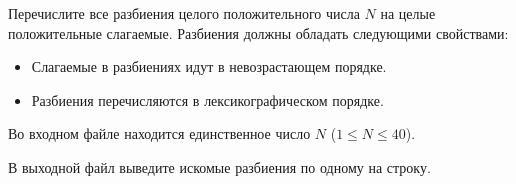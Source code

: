 

Перечислите все разбиения целого положительного числа $N$ на целые положительные слагаемые.
Разбиения должны обладать следующими свойствами:
\begin{itemize}
    \item
    Слагаемые в разбиениях идут в невозрастающем порядке.
    \item
    Разбиения перечисляются в лексикографическом порядке.
\end{itemize}

\InputFile
Во входном файле находится единственное число $N$ ($1 \leqslant N \leqslant 40$).

\OutputFile
В выходной файл выведите искомые разбиения по одному на строку.

